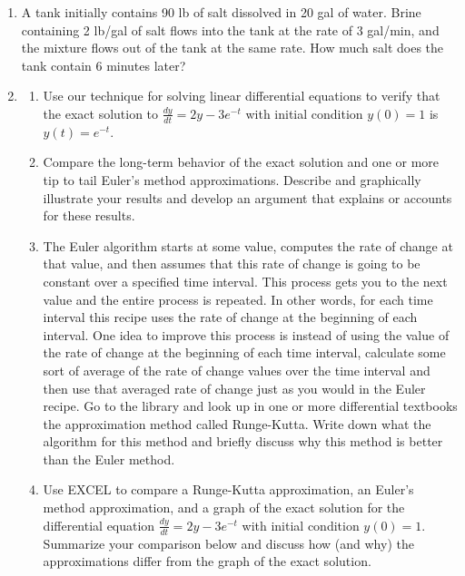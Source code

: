 \begin{enumerate}
\item	A tank initially contains 90 lb of salt dissolved in 20 gal of water. Brine containing 2 lb/gal of salt flows into the tank at the rate of 3 gal/min, and the mixture flows out of the tank at the same rate. How much salt does the tank contain 6 minutes later? \label{04HWproblem5}
\vfill

\clearpage

\item \label{04HWproblem6}
\begin{enumerate}
\item Use our technique for solving linear differential equations to verify that the exact solution to $\displaystyle\frac{dy}{dt}=2y-3e^{-t}$ with initial condition $y(0) = 1$ is $y(t) = e^{-t}$.

\item	Compare the long-term behavior of the exact solution and one or more tip to tail Euler's method approximations. Describe and graphically illustrate your results and develop an argument that explains or accounts for these results.

\item The Euler algorithm starts at some value, computes the rate of change at that value, and then assumes that this rate of change is going to be constant over a specified time interval. This process gets you to the next value and the entire process is repeated. In other words, for each time interval this recipe uses the rate of change at the beginning of each interval. One idea to improve this process is instead of using the value of the rate of change at the beginning of each time interval, calculate some sort of average of the rate of change values over the time interval and then use that averaged rate of change just as you would in the Euler recipe. Go to the library and look up in one or more differential textbooks the approximation method called Runge-Kutta. Write down what the algorithm for this method and briefly discuss why this method is better than the Euler method. 

\item	Use EXCEL to compare a Runge-Kutta approximation, an Euler's method approximation, and a graph of the exact solution for the differential equation $\displaystyle\frac{dy}{dt}=2y-3e^{-t}$ with initial condition $y(0) = 1$. Summarize your comparison below and discuss how (and why) the approximations differ from the graph of the exact solution.
\end{enumerate}


\end{enumerate}
